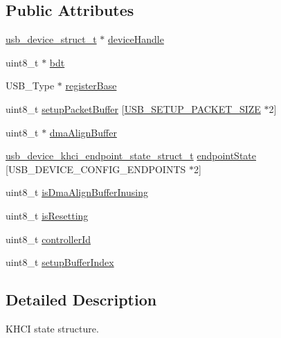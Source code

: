 \subsection*{Public Attributes}
\begin{DoxyCompactItemize}
\item 
\hyperlink{group__usb__device__controller__driver_ga4be463ccd1fe520b377febafb0a06c2f}{usb\-\_\-device\-\_\-struct\-\_\-t} $\ast$ \hyperlink{struct__usb__device__khci__state__struct_ad941a856f8322b5a041028018c6d801f}{device\-Handle}
\item 
uint8\-\_\-t $\ast$ \hyperlink{struct__usb__device__khci__state__struct_ae5697fe1b2ccad39c0a166ab56de318a}{bdt}
\item 
U\-S\-B\-\_\-\-Type $\ast$ \hyperlink{struct__usb__device__khci__state__struct_a1558f2b2bc52c419b2332497af62e160}{register\-Base}
\item 
uint8\-\_\-t \hyperlink{struct__usb__device__khci__state__struct_a1624706ecc6bfd364c81afa987f320bb}{setup\-Packet\-Buffer} \mbox{[}\hyperlink{group__usb__device__driver_gabf1be648722b01577b84e52e1fb3d8f8}{U\-S\-B\-\_\-\-S\-E\-T\-U\-P\-\_\-\-P\-A\-C\-K\-E\-T\-\_\-\-S\-I\-Z\-E} $\ast$2\mbox{]}
\item 
uint8\-\_\-t $\ast$ \hyperlink{struct__usb__device__khci__state__struct_a572451afb27d66cfbcc459e9647c1f20}{dma\-Align\-Buffer}
\item 
\hyperlink{group__usb__device__controller__khci__driver_ga78d53188f22fcd0f4058fafea867d1df}{usb\-\_\-device\-\_\-khci\-\_\-endpoint\-\_\-state\-\_\-struct\-\_\-t} \hyperlink{struct__usb__device__khci__state__struct_a04b55a56698a07b05dcad52cb1a4c766}{endpoint\-State} \mbox{[}U\-S\-B\-\_\-\-D\-E\-V\-I\-C\-E\-\_\-\-C\-O\-N\-F\-I\-G\-\_\-\-E\-N\-D\-P\-O\-I\-N\-T\-S $\ast$2\mbox{]}
\item 
uint8\-\_\-t \hyperlink{struct__usb__device__khci__state__struct_a6df4a75d1ffb3f399e2323d6f14096be}{is\-Dma\-Align\-Buffer\-Inusing}
\item 
uint8\-\_\-t \hyperlink{struct__usb__device__khci__state__struct_afd210db81f2a9747019b128b3b49f0b8}{is\-Resetting}
\item 
uint8\-\_\-t \hyperlink{struct__usb__device__khci__state__struct_a4301d1c84230578464dc8e625d3db82f}{controller\-Id}
\item 
uint8\-\_\-t \hyperlink{struct__usb__device__khci__state__struct_ad0b7c5876d05379cf0d4a28c805c8d5b}{setup\-Buffer\-Index}
\end{DoxyCompactItemize}


\subsection{Detailed Description}
K\-H\-C\-I state structure. 

